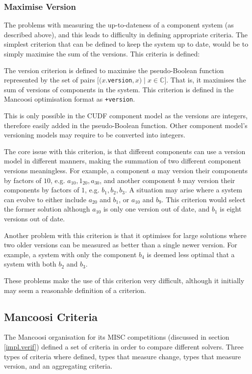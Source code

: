 \subsubsection{Maximise Version}
The problems with measuring the up-to-dateness of a component system (as described above), and this leads to difficulty in defining appropriate criteria.
The simplest criterion that can be defined to keep the system up to date, would be to simply maximise the sum of the versions.
This criteria is defined:

\begin{defs}
	The version criterion is defined to maximise the pseudo-Boolean function 
	represented by the set of pairs $[(x$.\verb+version+$,x) \mid x \in \mathbb{C}]$.
	That is, it maximises the sum of versions of components in the system.
	This criterion is defined in the Mancoosi optimisation format as \verb!+version!.
\end{defs}

This is only possible in the CUDF component model as the versions are integers, therefore easily added in the pseudo-Boolean function.
Other component model's versioning models may require to be converted into integers.

The core issue with this criterion, is that different components can use a version model in different manners, making the summation of two different component versions meaningless.
For example, a component $a$ may version their components by factors of $10$, e.g. $a_{10},1_{20},a_{30}$, 
and another component $b$ may version their components by factors of $1$, e.g. $b_1,b_2,b_3$.
A situation may arise where a system can evolve to either include $a_20$ and $b_1$, or $a_10$ and $b_9$.
This criterion would select the former solution although $a_10$ is only one version out of date, and $b_1$ is eight versions out of date. 

Another problem with this criterion is that it optimises for large solutions where two older versions can be measured as better than a single newer version.
For example, a system with only the component $b_4$ is deemed less optimal that a system with both $b_2$ and $b_3$.

These problems make the use of this criterion very difficult, although it initially may seem a reasonable definition of a criterion.   


\subsection{Mancoosi Criteria}
The Mancoosi organisation for its MISC competitions (discussed in section \ref{impl.verif}) defined a set of criteria in order to compare different solvers.
Three types of criteria where defined, types that measure change, types that measure version, and an aggregating criteria. 

